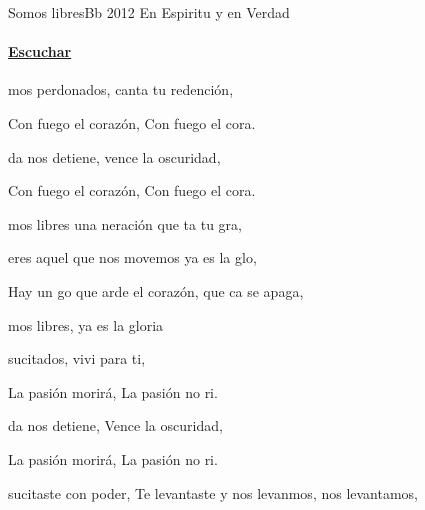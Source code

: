 \documentclass[12pt, spanish]{book}
\begin{document}
    \begin{song}{Somos libres}{Bb}
        {2012} %
        {En Espiritu y en Verdad}
        {} %
        {}
        \ifChordBk
        \paragraph{\mbox{}\hfill\protect\href{https://open.spotify.com/intl-es/track/2C5f7uN6SEhhZuEBiVednO}{Escuchar}\mbox{}\hfill}
        \fi



        \begin{SBOpGroup}
            mos perdonados, canta tu redención,

            Con fuego  el corazón, Con fuego  el cora.

            da nos detiene, vence la oscuridad,

            Con fuego  el corazón, Con fuego  el cora.
        \end{SBOpGroup}

        \begin{SBChorus}
            mos libres una neración que    ta tu gra,

             eres aquel  que nos movemos   ya es la glo,

            Hay un go que arde  el corazón, que ca se apaga,

            mos libres,      ya es la gloria
        \end{SBChorus}

        \begin{SBOpGroup}
            sucitados, vivi para ti,

            La pasión  morirá,   La pasión no ri.

            da nos detiene, Vence la oscuridad,

            La pasión  morirá,   La pasión no ri.
        \end{SBOpGroup}
        \vskip 20pt
        \begin{SBOpGroup}
            sucitaste con poder, Te levantaste y nos levanmos, nos levantamos,


\end{SBOpGroup}
\end{song}
\end{document}
